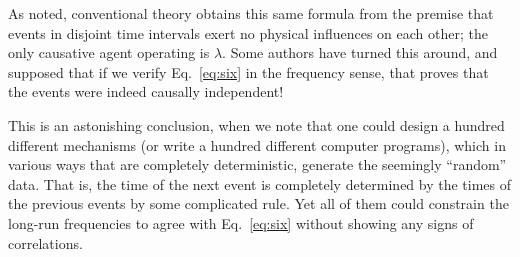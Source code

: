 \documentclass[12pt]{article}
\newcommand{\refeq}[1]{Eq.~\ref{#1}}
\begin{document}
As noted, conventional theory obtains this same formula from the premise that events in
disjoint time intervals exert no physical influences on each other; the only causative agent operating
is $\lambda$. Some authors have turned this around, and supposed that if we verify \refeq{eq:six} in the frequency
sense, that proves that the events were indeed causally independent!

This is an astonishing conclusion, when we note that one could design a hundred different
mechanisms (or write a hundred different computer programs), which in various ways that are
completely deterministic, generate the seemingly ``random'' data. That is, the time of the next
event is completely determined by the times of the previous events by some complicated rule. Yet
all of them could constrain the long-run frequencies to agree with \refeq{eq:six}  without showing any signs
of correlations.



\end{document}
